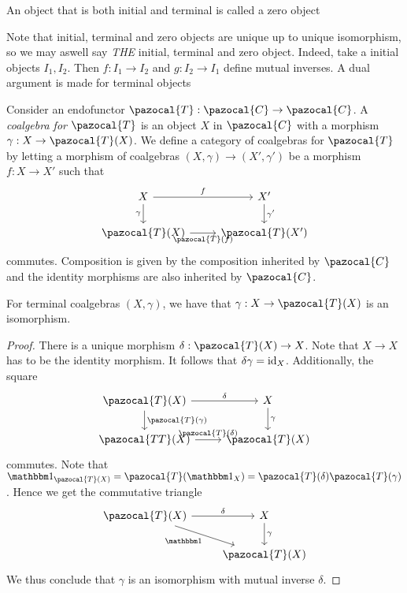     \begin{definition}
        An object that is both initial and terminal is called a zero object
    \end{definition}
    \begin{remark}
        Note that initial, terminal and zero objects are unique up to unique isomorphism, so we may aswell say \emph{THE} initial, terminal and zero object. Indeed, take a initial objects $I_1,I_2$. Then $f: I_1\rightarrow I_2$ and $g: I_2 \rightarrow I_1$ define mutual inverses. A dual argument is made for terminal objects
    \end{remark}
    \begin{definition}
        Consider an endofunctor $\pazocal{T}: \pazocal{C}\rightarrow \pazocal{C}$. A \emph{coalgebra for $\pazocal{T}$} is an object $X$ in $\pazocal{C}$ with a morphism $\gamma : X\rightarrow \pazocal{T}(X)$. We define a category of coalgebras for $\pazocal{T}$ by letting a morphism of coalgebras $(X,\gamma)\rightarrow (X', \gamma')$ be a morphism $f: X\rightarrow X'$ such that 
        $$
            \begin{tikzcd}
                X \arrow[r,"f"]\arrow[d,"\gamma",swap] & X'\arrow[d,"\gamma'"]\\
                \pazocal{T}(X) \arrow[r,"\pazocal{T}(f)",swap] & \pazocal{T}(X')
            \end{tikzcd}
        $$
        commutes. Composition is given by the composition inherited by $\pazocal{C}$ and the identity morphisms are also inherited by $\pazocal{C}$. 
    \end{definition}
    \begin{proposition}
        For terminal coalgebras $(X,\gamma)$, we have that $\gamma: X\rightarrow \pazocal{T}(X)$ is an isomorphism. 
    \end{proposition}
    \begin{proof}
        There is a unique morphism $\delta: \pazocal{T}(X)\rightarrow X$. Note that $X\rightarrow X$ has to be the identity morphism. It follows that $\delta\gamma= \mathrm{id}_X$. Additionally, the square
        $$
            \begin{tikzcd}
                \pazocal{T}(X) \arrow[r,"\delta"]\arrow[d,"\pazocal{T}(\gamma)"] & X\arrow[d,"\gamma"] \\
                \pazocal{TT}(X) \arrow[r, "\pazocal{T}(\delta)"] & \pazocal{T}(X)
            \end{tikzcd}
        $$
        commutes. Note that  $\fone_{\pazocal{T}(X)} = \pazocal{T}(\fone_X)= \pazocal{T}(\delta)\pazocal{T}(\gamma)$. Hence we get the commutative triangle 
        $$
            \begin{tikzcd}
                \pazocal{T}(X)\arrow[r,"\delta"] \arrow[rd,"\fone",swap] & X \arrow[d,"\gamma"]\\
                & \pazocal{T}(X)
            \end{tikzcd}
        $$
        We thus conclude that $\gamma$ is an isomorphism with mutual inverse $\delta$.
    \end{proof}
